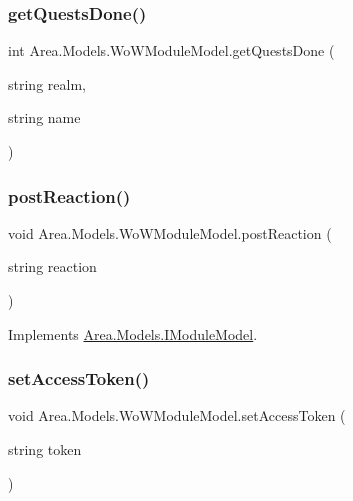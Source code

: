 \subsubsection{\texorpdfstring{get\+Quests\+Done()}{getQuestsDone()}}
{\footnotesize\ttfamily int Area.\+Models.\+Wo\+W\+Module\+Model.\+get\+Quests\+Done (\begin{DoxyParamCaption}\item[{string}]{realm,  }\item[{string}]{name }\end{DoxyParamCaption})\hspace{0.3cm}{\ttfamily [inline]}}

\mbox{\label{classArea_1_1Models_1_1WoWModuleModel_a04335d82b02dd3cfe3b9ae0cb47125f6}} 
\subsubsection{\texorpdfstring{post\+Reaction()}{postReaction()}}
{\footnotesize\ttfamily void Area.\+Models.\+Wo\+W\+Module\+Model.\+post\+Reaction (\begin{DoxyParamCaption}\item[{string}]{reaction }\end{DoxyParamCaption})\hspace{0.3cm}{\ttfamily [inline]}}



Implements \mbox{\hyperlink{interfaceArea_1_1Models_1_1IModuleModel_af2c1a82bd894255ab2099440f4f3d6f7}{Area.\+Models.\+I\+Module\+Model}}.

\mbox{\label{classArea_1_1Models_1_1WoWModuleModel_a7f03216eb89034c3097b540a26addb0a}} 
\subsubsection{\texorpdfstring{set\+Access\+Token()}{setAccessToken()}}
{\footnotesize\ttfamily void Area.\+Models.\+Wo\+W\+Module\+Model.\+set\+Access\+Token (\begin{DoxyParamCaption}\item[{string}]{token }\end{DoxyParamCaption})\hspace{0.3cm}{\ttfamily [inline]}}


